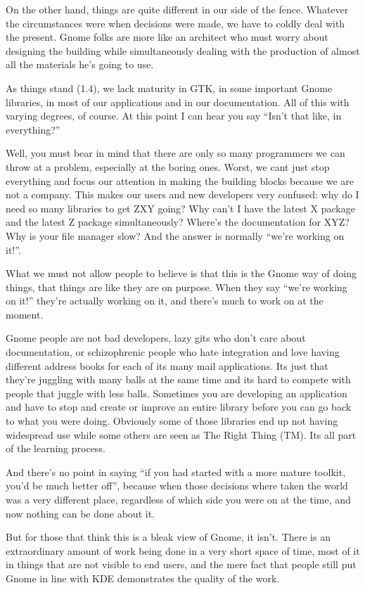 \documentclass{book}
\begin{document}
On the other hand, things are quite different in our side of the
fence. Whatever the circumstances were when decisions were made, we
have to coldly deal with the present. Gnome folks are more like an
architect who must worry about designing the building while
simultaneously dealing with the production of almost all the materials
he's going to use.

As things stand (1.4), we lack maturity in GTK, in some important
Gnome libraries, in most of our applications and in our
documentation. All of this with varying degrees, of course. At this
point I can hear you say ``Isn't that like, in everything?''

Well, you must bear in mind that there are only so many programmers we
can throw at a problem, especially at the boring ones. Worst, we cant
just stop everything and focus our attention in making the building
blocks because we are not a company. This makes our users and new
developers very confused: why do I need so many libraries to get ZXY
going? Why can't I have the latest X package and the latest Z package
simultaneously? Where's the documentation for XYZ? Why is your file
manager slow? And the answer is normally ``we're working on it!''.

What we must not allow people to believe is that this is the Gnome way
of doing things, that things are like they are on purpose. When they
say ``we're working on it!'' they're actually working on it, and
there's much to work on at the moment.

Gnome people are not bad developers, lazy gits who don't care about
documentation, or schizophrenic people who hate integration and love
having different address books for each of its many mail
applications. Its just that they're juggling with many balls at the
same time and its hard to compete with people that juggle with less
balls. Sometimes you are developing an application and have to stop
and create or improve an entire library before you can go back to what
you were doing. Obviously some of those libraries end up not having
widespread use while some others are seen as The Right Thing (TM). Its
all part of the learning process.

And there's no point in saying ``if you had started with a more mature
toolkit, you'd be much better off'', because when those decisions
where taken the world was a very different place, regardless of which
side you were on at the time, and now nothing can be done about it.

But for those that think this is a bleak view of Gnome, it
isn't. There is an extraordinary amount of work being done in a very
short space of time, most of it in things that are not visible to end
users, and the mere fact that people still put Gnome in line with KDE
demonstrates the quality of the work.
\end{document}
